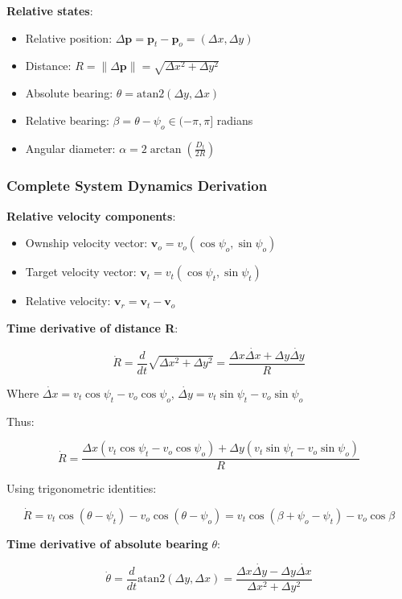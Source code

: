 \documentclass[11pt,a4paper]{article}
\numberwithin{equation}{section}
\begin{document}
\textbf{Relative states}:
\begin{itemize}
\item Relative position: $\Delta\mathbf{p} = \mathbf{p}_t - \mathbf{p}_o = (\Delta x, \Delta y)$
\item Distance: $R = \|\Delta\mathbf{p}\| = \sqrt{\Delta x^2 + \Delta y^2}$
\item Absolute bearing: $\theta = \mathrm{atan2}(\Delta y, \Delta x)$
\item Relative bearing: $\beta = \theta - \psi_o \in (-\pi, \pi]$ radians
\item Angular diameter: $\alpha = 2\arctan\left(\frac{D_t}{2R}\right)$
\end{itemize}

\subsubsection{Complete System Dynamics Derivation}

\textbf{Relative velocity components}:
\begin{itemize}
\item Ownship velocity vector: $\mathbf{v}_o = v_o(\cos\psi_o, \sin\psi_o)$
\item Target velocity vector: $\mathbf{v}_t = v_t(\cos\psi_t, \sin\psi_t)$
\item Relative velocity: $\mathbf{v}_r = \mathbf{v}_t - \mathbf{v}_o$
\end{itemize}

\textbf{Time derivative of distance R}:

\[
\dot{R} = \frac{d}{dt}\sqrt{\Delta x^2 + \Delta y^2} = \frac{\Delta x \dot{\Delta x} + \Delta y \dot{\Delta y}}{R}
\]

Where $\dot{\Delta x} = v_t\cos\psi_t - v_o\cos\psi_o$, $\dot{\Delta y} = v_t\sin\psi_t - v_o\sin\psi_o$

Thus:

\[
\dot{R} = \frac{\Delta x(v_t\cos\psi_t - v_o\cos\psi_o) + \Delta y(v_t\sin\psi_t - v_o\sin\psi_o)}{R}
\]

Using trigonometric identities:

\[
\dot{R} = v_t\cos(\theta - \psi_t) - v_o\cos(\theta - \psi_o) = v_t\cos(\beta + \psi_o - \psi_t) - v_o\cos\beta
\]

\textbf{Time derivative of absolute bearing} $\theta$:

\[
\dot{\theta} = \frac{d}{dt}\mathrm{atan2}(\Delta y, \Delta x) = \frac{\Delta x\dot{\Delta y} - \Delta y\dot{\Delta x}}{\Delta x^2 + \Delta y^2}
\]
\end{document}
